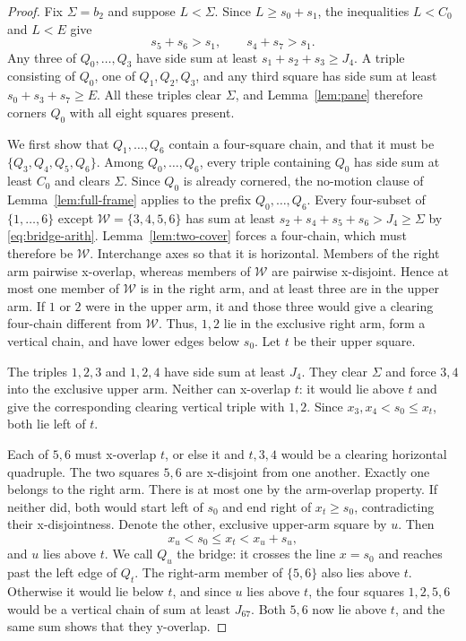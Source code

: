 \documentclass[12pt]{amsart}
\theoremstyle{definition}
\theoremstyle{remark}
\numberwithin{equation}{section}
\numberwithin{figure}{section}
\numberwithin{table}{section}
\begin{document}
\begin{proof}
Fix $\Sigma=b_2$ and suppose $L<\Sigma$.
Since $L\ge s_0+s_1$, the inequalities $L<C_0$ and $L<E$ give
\begin{equation}\label{eq:bridge-arith}
s_5+s_6>s_1,\qquad s_4+s_7>s_1.
\end{equation}
Any three of $Q_0,\ldots,Q_3$ have side sum at least $s_1+s_2+s_3\ge J_4$.
A triple consisting of $Q_0$, one of $Q_1,Q_2,Q_3$, and any third square has
side sum at least $s_0+s_3+s_7\ge E$. All these triples clear $\Sigma$, and
Lemma~\ref{lem:pane} therefore corners $Q_0$ with all eight squares present.

We first show that $Q_1,\ldots,Q_6$ contain a four-square chain, and that
it must be $\{Q_3,Q_4,Q_5,Q_6\}$. Among $Q_0,\ldots,Q_6$, every triple
containing $Q_0$ has side sum at least $C_0$ and clears $\Sigma$. Since $Q_0$ is already cornered, the
no-motion clause of Lemma~\ref{lem:full-frame} applies to the prefix
$Q_0,\ldots,Q_6$. Every four-subset of $\{1,\ldots,6\}$ except
$\mathcal W=\{3,4,5,6\}$ has sum at least
$s_2+s_4+s_5+s_6>J_4\ge\Sigma$ by \eqref{eq:bridge-arith}. Lemma~\ref{lem:two-cover} forces a four-chain,
which must therefore be $\mathcal W$. Interchange axes so that it is
horizontal. Members of the right arm pairwise x-overlap, whereas members
of $\mathcal W$ are pairwise x-disjoint. Hence at most one member of
$\mathcal W$ is in the right arm, and at least three are in the upper arm.
If $1$ or $2$ were in the upper arm, it and
those three would give a clearing four-chain different from $\mathcal W$.
Thus, $1,2$ lie in the exclusive right arm, form a vertical chain, and have
lower edges below $s_0$. Let $t$ be their upper square.

The triples $1,2,3$ and $1,2,4$ have side sum at least $J_4$. They clear
$\Sigma$ and force $3,4$ into
the exclusive upper arm. Neither can x-overlap $t$: it
would lie above $t$ and give the corresponding clearing vertical triple
with $1,2$. Since $x_3,x_4<s_0\le x_t$, both lie left of $t$.

Each of $5,6$ must x-overlap $t$, or else it and
$t,3,4$ would be a clearing horizontal quadruple. The two squares
$5,6$ are x-disjoint from one another. Exactly one belongs to the right
arm. There is at most one by the arm-overlap property. If neither did,
both would start left of $s_0$ and end right of $x_t\ge s_0$, contradicting
their x-disjointness. Denote the other, exclusive upper-arm square by $u$.
Then
\begin{equation}\label{eq:bridge-cross}
x_u<s_0\le x_t<x_u+s_u,
\end{equation}
and $u$ lies above $t$. We call $Q_u$ the bridge: it crosses the line
$x=s_0$ and reaches past the left edge of $Q_t$. The right-arm member of $\{5,6\}$ also lies
above $t$. Otherwise it would lie below $t$, and since $u$ lies above $t$,
the four squares $1,2,5,6$ would be a vertical chain of sum at least
$J_{67}$. Both $5,6$ now lie above $t$, and the same sum shows that they
y-overlap.


\end{proof}
\end{document}
